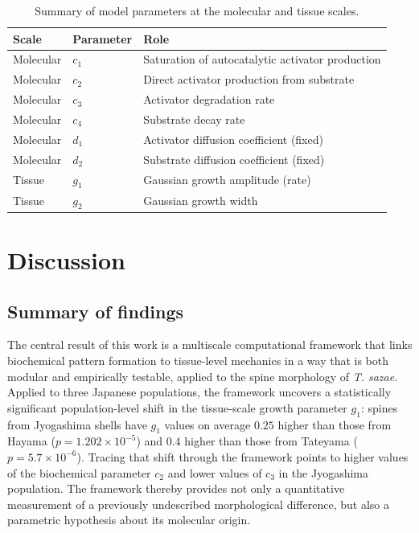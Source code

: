 \documentclass[11pt]{article}
\begin{document}
\begin{table}[htbp]
\centering
\caption{Summary of model parameters at the molecular and tissue scales.}
\label{tab:parameters}
\begin{tabular}{lll}
\toprule
Scale & Parameter & Role \\
\midrule
Molecular & $c_1$ & Saturation of autocatalytic activator production \\
Molecular & $c_2$ & Direct activator production from substrate \\
Molecular & $c_3$ & Activator degradation rate \\
Molecular & $c_4$ & Substrate decay rate \\
Molecular & $d_1$ & Activator diffusion coefficient (fixed) \\
Molecular & $d_2$ & Substrate diffusion coefficient (fixed) \\
Tissue    & $g_1$ & Gaussian growth amplitude (rate) \\
Tissue    & $g_2$ & Gaussian growth width \\
\bottomrule
\end{tabular}
\end{table}

\section{Discussion}
\label{sec:discussion}

\subsection{Summary of findings}

The central result of this work is a multiscale computational framework
that links biochemical pattern formation to tissue-level mechanics in a
way that is both modular and empirically testable, applied to the
spine morphology of \textit{T. sazae}. Applied to three Japanese
populations, the framework uncovers a statistically significant
population-level shift in the tissue-scale growth parameter $g_1$: spines
from Jyogashima shells have $g_1$ values on average $0.25$ higher than
those from Hayama ($p = 1.202 \times 10^{-5}$) and $0.4$ higher than
those from Tateyama ($p = 5.7 \times 10^{-6}$). Tracing that shift
through the framework points to higher values of the biochemical
parameter $c_2$ and lower values of $c_3$ in the Jyogashima population.
The framework thereby provides not only a quantitative measurement of a
previously undescribed morphological difference, but also a parametric
hypothesis about its molecular origin.
\end{document}
